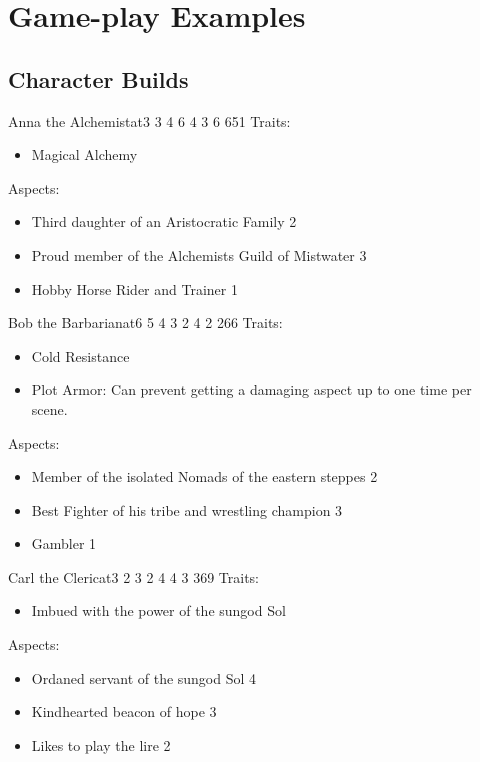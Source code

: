\documentclass[11pt]{article}
\begin{document}
{\newpage
\section{Game-play Examples}
\label{sec:org5111e03}
\subsection{Character Builds}
\label{sec:org773ec66}

\begin{npc}{Anna the Alchemist}{at}{3 3 4 6 4 3 6 6}{51}
Traits:
\begin{itemize}
\item Magical Alchemy
\end{itemize}
\columnbreak
Aspects:
\begin{itemize}
\item Third daughter of an Aristocratic Family 2
\item Proud member of the Alchemists Guild of Mistwater 3
\item Hobby Horse Rider and Trainer 1
\end{itemize}
\end{npc}

\begin{npc}{Bob the Barbarian}{at}{6 5 4 3 2 4 2 2}{66}
Traits:
\begin{itemize}
\item Cold Resistance
\item Plot Armor: Can prevent getting a damaging aspect up to one time per scene.
\end{itemize}
\columnbreak

Aspects:
\begin{itemize}
\item Member of the isolated Nomads of the eastern steppes 2
\item Best Fighter of his tribe and wrestling champion 3
\item Gambler 1
\end{itemize}
\end{npc}

\begin{npc}{Carl the Cleric}{at}{3 2 3 2 4 4 3 3}{69}
Traits:
\begin{itemize}
\item Imbued with the power of the sungod Sol
\end{itemize}
\columnbreak

Aspects:
\begin{itemize}
\item Ordaned servant of the sungod Sol 4
\item Kindhearted beacon of hope 3
\item Likes to play the lire 2
\end{itemize}
\end{npc}

}
\end{document}
